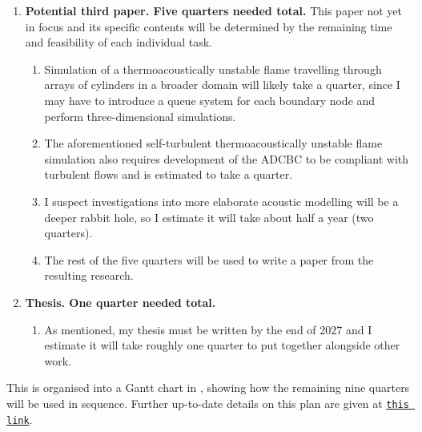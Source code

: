\begin{enumerate}
\begin{enumerate}
    \end{enumerate}
\item \textbf{Potential third paper. Five quarters needed total.} This paper not yet in focus and its specific contents will be determined by the remaining time and feasibility of each individual task.
    \begin{enumerate}
    \item Simulation of a thermoacoustically unstable flame travelling through arrays of cylinders in a broader domain will likely take a quarter, since I may have to introduce a queue system for each boundary node and perform three-dimensional simulations.
    \item The aforementioned self-turbulent thermoacoustically unstable flame simulation also requires development of the ADCBC to be compliant with turbulent flows and is estimated to take a quarter.
    \item I suspect investigations into more elaborate acoustic modelling will be a deeper rabbit hole, so I estimate it will take about half a year (two quarters).
    \item The rest of the five quarters will be used to write a paper from the resulting research.
    \end{enumerate}
\item \textbf{Thesis. One quarter needed total.}
    \begin{enumerate}
    \item As mentioned, my thesis must be written by the end of 2027 and I estimate it will take roughly one quarter to put together alongside other work.
    \end{enumerate}
\end{enumerate}
This is organised into a Gantt chart in , showing how the remaining nine quarters will be used in sequence. Further up-to-date details on this plan are given at \href{https://www.dropbox.com/scl/fi/4w62xppcfkywnr7nm8a6v/plan-Y3.md?rlkey=yx4ez0nmqjaabqseotnzfiqsn&st=lll313fe&dl=0}{\texttt{this link}}.


